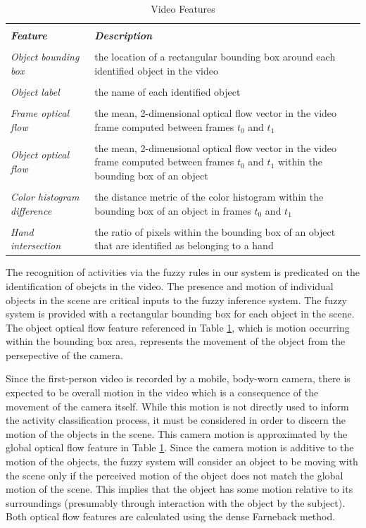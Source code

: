 \documentclass[12pt]{report}
\begin{document}
\begin{table}
\caption{Video Features}
\begin{center}
\begin{tabular}{p{3cm}p{5cm}}
\hline \\
\textbf{\textit{Feature}}&\textbf{\textit{Description}} \\
\hline
\hline \\
\textit{Object bounding box} & the location of a rectangular bounding box around each identified object in the video \\ \\
\textit{Object label} & the name of each identified object \\ \\
\textit{Frame optical flow} & the mean, 2-dimensional optical flow vector in the video frame computed between frames $t_0$ and $t_1$\\ \\
\textit{Object optical flow} & the mean, 2-dimensional optical flow vector in the video frame computed between frames $t_0$ and $t_1$ within the bounding box of an object \\ \\
\textit{Color histogram difference} & the distance metric of the color histogram within the bounding box of an object in frames $t_0$ and $t_1$ \\ \\
\textit{Hand intersection} & the ratio of pixels within the bounding box of an object that are identified as belonging to a hand \\
\hline
\end{tabular}
\label{videoFeatures}
\end{center}
\end{table}


The recognition of activities via the fuzzy rules in our system is predicated on the identification of obejcts in the video. The presence and motion of individual objects in the scene are critical inputs to the fuzzy inference system. The fuzzy system is provided with a rectangular bounding box for each object in the scene. The object optical flow feature referenced in Table \ref{videoFeatures}, which is motion occurring within the bounding box area, represents the movement of the object from the persepective of the camera. 

Since the first-person video is recorded by a mobile, body-worn camera, there is expected to be overall motion in the video which is a consequence of the movement of the camera itself. While this motion is not directly used to inform the activity classification process, it must be considered in order to discern the motion of the objects in the scene. This camera motion is approximated by the global optical flow feature in Table \ref{videoFeatures}. Since the camera motion is additive to the motion of the objects, the fuzzy system will consider an object to be moving with the scene only if the perceived motion of the object does not match the global motion of the scene. This implies that the object has some motion relative to its surroundings (presumably through interaction with the object by the subject). Both optical flow features are calculated using the dense Farneback method.
\end{document}
